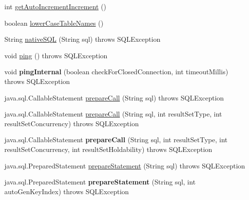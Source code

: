 \begin{DoxyCompactItemize}
int \mbox{\hyperlink{classcom_1_1mysql_1_1cj_1_1jdbc_1_1_connection_impl_a47d3fb6ffbaaff0190ea15e3c35d7270}{get\+Auto\+Increment\+Increment}} ()
\item 
boolean \mbox{\hyperlink{classcom_1_1mysql_1_1cj_1_1jdbc_1_1_connection_impl_a75475406eba7048aeb899c27d04f2c59}{lower\+Case\+Table\+Names}} ()
\item 
String \mbox{\hyperlink{classcom_1_1mysql_1_1cj_1_1jdbc_1_1_connection_impl_a6c1d69bc49b04ac714fbe2e79062f2c1}{native\+S\+QL}} (String sql)  throws S\+Q\+L\+Exception 
\item 
void \mbox{\hyperlink{classcom_1_1mysql_1_1cj_1_1jdbc_1_1_connection_impl_a790847769075cca4f1f42d47b864f3e3}{ping}} ()  throws S\+Q\+L\+Exception 
\item 
\mbox{\label{classcom_1_1mysql_1_1cj_1_1jdbc_1_1_connection_impl_a7da1e11bed26e0346d29c166fc99b133}} 
void {\bfseries ping\+Internal} (boolean check\+For\+Closed\+Connection, int timeout\+Millis)  throws S\+Q\+L\+Exception 
\item 
java.\+sql.\+Callable\+Statement \mbox{\hyperlink{classcom_1_1mysql_1_1cj_1_1jdbc_1_1_connection_impl_aa4436c4ed7f7b2c5ea3f12b62486e844}{prepare\+Call}} (String sql)  throws S\+Q\+L\+Exception 
\item 
java.\+sql.\+Callable\+Statement \mbox{\hyperlink{classcom_1_1mysql_1_1cj_1_1jdbc_1_1_connection_impl_a92f3c0f9e16a6a2a59ab6faff6838154}{prepare\+Call}} (String sql, int result\+Set\+Type, int result\+Set\+Concurrency)  throws S\+Q\+L\+Exception 
\item 
\mbox{\label{classcom_1_1mysql_1_1cj_1_1jdbc_1_1_connection_impl_a40c8901e99390a31378f4ad4f09cbdf4}} 
java.\+sql.\+Callable\+Statement {\bfseries prepare\+Call} (String sql, int result\+Set\+Type, int result\+Set\+Concurrency, int result\+Set\+Holdability)  throws S\+Q\+L\+Exception 
\item 
java.\+sql.\+Prepared\+Statement \mbox{\hyperlink{classcom_1_1mysql_1_1cj_1_1jdbc_1_1_connection_impl_ad3f606e709c6f97bb42701340ff0d44d}{prepare\+Statement}} (String sql)  throws S\+Q\+L\+Exception 
\item 
\mbox{\label{classcom_1_1mysql_1_1cj_1_1jdbc_1_1_connection_impl_a6ad097415e0e105b2d7629cc4d6e24a5}} 
java.\+sql.\+Prepared\+Statement {\bfseries prepare\+Statement} (String sql, int auto\+Gen\+Key\+Index)  throws S\+Q\+L\+Exception 

\end{DoxyCompactItemize}

